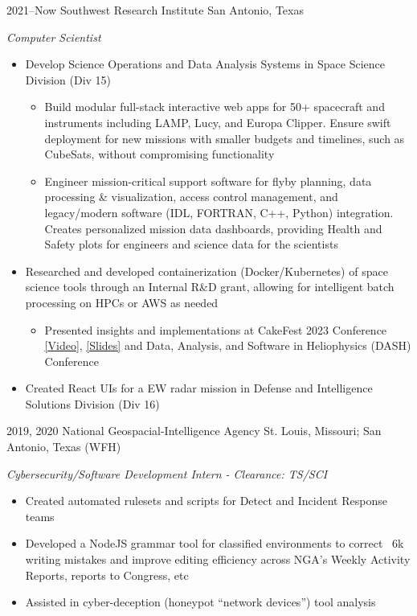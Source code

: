 \documentclass[]{friggeri-cv} %
\begin{document}
\begin{entrylist}

\entry
{2021--Now}
{Southwest Research Institute}
{San Antonio, Texas}
{\emph{Computer Scientist}
	\begin{itemize}
		\item Develop Science Operations and Data Analysis Systems in Space Science Division (Div 15)
		\begin{itemize}
			\item Build modular full-stack interactive web apps for 50+ spacecraft and instruments including LAMP, Lucy, and Europa Clipper. Ensure swift deployment for new missions with smaller budgets and timelines, such as CubeSats, without compromising functionality
			\item Engineer mission-critical support software for flyby planning, data processing \& visualization, access control management, and legacy/modern software (IDL, FORTRAN, C++, Python) integration. Creates personalized mission data dashboards, providing Health and Safety plots for engineers and science data for the scientists
		\end{itemize}
		\item Researched and developed containerization (Docker/Kubernetes) of space science tools through an Internal R\&D grant, allowing for intelligent batch processing on HPCs or AWS as needed
		\begin{itemize}
			\item Presented insights and implementations at CakeFest 2023 Conference \href{https://www.youtube.com/live/4KB92R7UQc8?si=sA3sVMHHHfgKZKgp&t=19699}{\underline{[Video]}}, \href{https://umer936.com/cakefest-2023}{\underline{[Slides]}} and Data, Analysis, and Software in Heliophysics (DASH) Conference
		\end{itemize}
		\item Created React UIs for a EW radar mission in Defense and Intelligence Solutions Division (Div 16)
	\end{itemize}
}

\vspace{-5pt}

\entry
{2019, 2020}
{National Geospacial-Intelligence Agency}
{St. Louis, Missouri; San Antonio, Texas (WFH)}
{\emph{Cybersecurity/Software Development Intern - Clearance: TS/SCI}
	\begin{itemize}
		\item Created automated rulesets and scripts for Detect and Incident Response teams
		\item Developed a NodeJS grammar tool for classified environments to correct ~6k writing mistakes and improve editing efficiency across NGA's Weekly Activity Reports, reports to Congress, etc
		\item Assisted in cyber-deception (honeypot ``network devices'') tool analysis
	\end{itemize}
}
\vspace{-5pt}
	

\end{entrylist}
\end{document}
